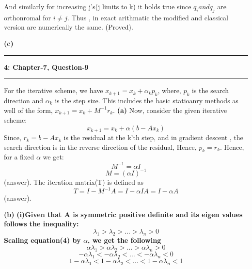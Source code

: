 \documentclass{article}
\newcommand\question[2]{\vspace{.25in}\hrule\textbf{#1: #2}\hrule\vspace{.10in}}
\renewcommand\part[1]{\vspace{.10in}\textbf{(#1)}}
\begin{document}
 And similarly for increasing j's(j limits to k) it holds true since $q_i and q_j$ are orthonromal for $i\neq j$. Thus , in exact arithmatic the modified and classical version are numerically the same. (Proved). \newline

 \part{c}

 \question{4}{Chapter-7, Question-9}
 For the iterative scheme, we have $x_{k+1} = x_{k} + \alpha_{k}p_{k}$, where, $p_{k}$ is the search direction and $\alpha_{k}$ is the step size. This includes the basic statioanry methods as well of the form, $x_{k+1} = x_{k} + M^{-1}r_{k}$.\newline
 \part{a}
 Now, consider the given iterative scheme: \newline
 \[ x_{k+1} = x_{k} + \alpha(b - Ax_{k}) \]
 Since, $r_{k} = b - Ax_{k}$ is the residual at the k'th step, and in gradient descent , the search direction is in the reverse direction of the residual, Hence, $p_{k} = r_{k}$. Hence, for a fixed $\alpha$ we get: 
 \[M^{-1} = \alpha I\]
 \[M = (\alpha I)^{-1}\]
 (answer). \newline
 The iteration matrix(T) is defined as \newline
 \[T = I - M^{-1}A = I - \alpha I A = I - \alpha A\]
 (answer). \newline

  \part{b}
  \bf {(i)}Given that A is symmetric positive definite and its eigen values follows the inequality: \newline
  \begin{equation}
	  \lambda_1 > \lambda_2 > \dots > \lambda_n > 0
  \end{equation}
  Scaling equation(4) by $\alpha$, we get the following
	\[  \alpha\lambda_1 > \alpha\lambda_2 > \dots > \alpha\lambda_n > 0 \]
	\[  -\alpha\lambda_1 < -\alpha\lambda_2 < \dots < -\alpha\lambda_n < 0 \]
 \begin{equation}
	 1 -\alpha\lambda_1 < 1 -\alpha\lambda_2 < \dots < 1 -\alpha\lambda_n < 1 
 \end{equation}
\end{document}
